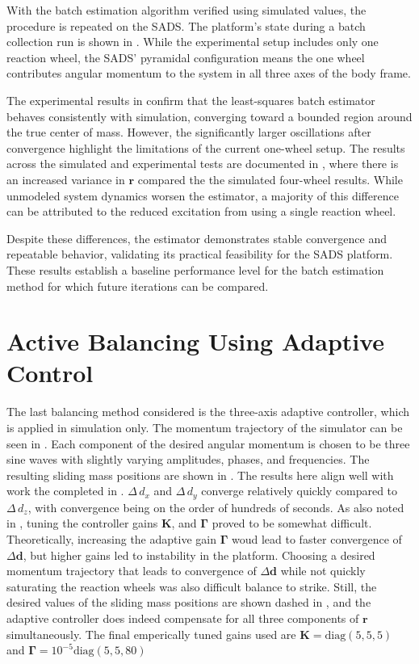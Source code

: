 With the batch estimation algorithm verified using simulated values, the procedure is repeated on the SADS. The platform's state during a batch collection run is shown in . While the experimental setup includes only one reaction wheel, the SADS' pyramidal configuration means the one wheel contributes angular momentum to the system in all three axes of the body frame. 

The experimental results in  confirm that the least-squares batch estimator behaves consistently with simulation, converging toward a bounded region around the true center of mass. However, the significantly larger oscillations after convergence highlight the limitations of the current one-wheel setup. The results across the simulated and experimental tests are documented in , where there is an increased variance in $\bm{r}$ compared the the simulated four-wheel results. While unmodeled system dynamics worsen the estimator, a majority of this difference can be attributed to the reduced excitation from using a single reaction wheel.

Despite these differences, the estimator demonstrates stable convergence and repeatable behavior, validating its practical feasibility for the SADS platform. These results establish a baseline performance level for the batch estimation method for which future iterations can be compared.

\section{Active Balancing Using Adaptive Control}

The last balancing method considered is the three-axis adaptive controller, which is applied in simulation only. The momentum trajectory of the simulator can be seen in . Each component of the desired angular momentum is chosen to be three sine waves with slightly varying amplitudes, phases, and frequencies. The resulting sliding mass positions are shown in . The results here align well with work the completed in \cite{kim_automatic_2009}. $\Delta\,d_x$ and $\Delta\,d_y$ converge relatively quickly compared to $\Delta\bm\,d_z$, with convergence being on the order of hundreds of seconds. As also noted in \cite{kim_automatic_2009}, tuning the controller gains $\bm{K}$, and $\bm{\Gamma}$ proved to be somewhat difficult. Theoretically, increasing the adaptive gain $\bm{\Gamma}$ woud lead to faster convergence of $\Delta\bm{d}$, but higher gains led to instability in the platform. Choosing a desired momentum trajectory that leads to convergence of $\Delta\bm{d}$ while not quickly saturating the reaction wheels was also difficult balance to strike. Still, the desired values of the sliding mass positions are shown dashed in , and the adaptive controller does indeed compensate for all three components of $\bm{r}$ simultaneously. The final emperically tuned gains used are 
$\bm{K} = \text{diag}(5,5,5)$ and  $\bm{\Gamma} = 10^{-5}\text{diag}(5, 5 , 80)$

